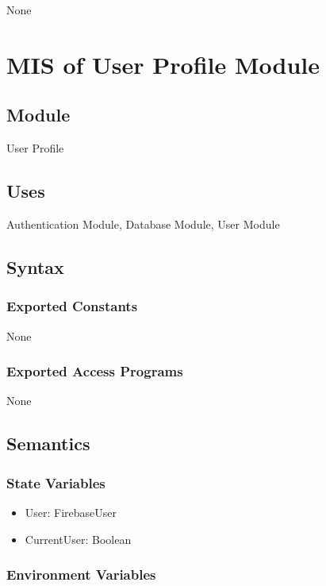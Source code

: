 \documentclass[12pt, titlepage]{article}
\begin{document}
None

\newpage

\section{MIS of User Profile Module} \label{mUP}

\subsection{Module}

User Profile

\subsection{Uses}

Authentication Module, Database Module, User Module

\subsection{Syntax}

\subsubsection{Exported Constants}

None

\subsubsection{Exported Access Programs}

None

\subsection{Semantics}

\subsubsection{State Variables}

\begin{itemize}
\item User: FirebaseUser
\item CurrentUser: Boolean
\end{itemize}

\subsubsection{Environment Variables}
\end{document}
